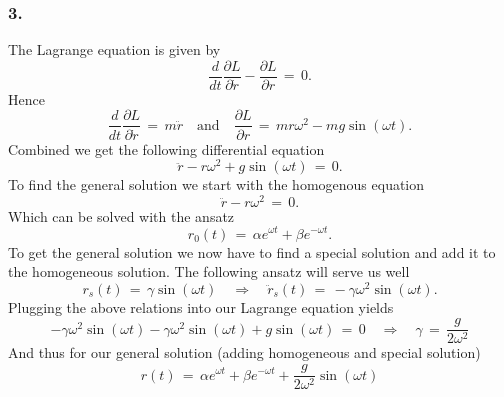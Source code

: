\subsubsection{3.}
The Lagrange equation is given by
\begin{equation*}
  \frac{d}{dt} \frac{\partial L}{\partial \dot r} - \frac{\partial L}{\partial
r} \,=\, 0.
\end{equation*}
Hence
\begin{equation*}
  \frac{d}{dt} \frac{\partial L}{\partial \dot r} \,=\, m \ddot r \quad
\text{and} \quad \frac{\partial L}{\partial r} \,=\, mr\omega^2 - mg
\sin(\omega t).
\end{equation*}
Combined we get the following differential equation
\begin{equation*}
   \ddot r - r \omega^2 + g\sin(\omega t) \,=\, 0.
\end{equation*}
To find the general solution we start with the homogenous equation 
\begin{equation*}
  \ddot r - r\omega^2 \,=\, 0.
\end{equation*}
Which can be solved with the ansatz
\begin{equation*}
  r_0(t) \,=\, \alpha e^{\omega t} + \beta e^{-\omega t}.
\end{equation*}
To get the general solution we now have to find a special solution and add it
to the homogeneous solution. The following ansatz will serve us well
\begin{equation*}
  r_s(t) \,=\, \gamma \sin(\omega t) \quad \Rightarrow \quad \ddot r_s(t) \,=\,
-\gamma \omega^2 \sin(\omega t).
\end{equation*}
Plugging the above relations into our Lagrange equation yields
\begin{equation*}
  - \gamma \omega^2 \sin(\omega t) - \gamma \omega^2 \sin(\omega t) + g
\sin(\omega t) \,=\, 0 \quad \Rightarrow \quad \gamma \,=\, \frac{g}{2\omega^2}  
\end{equation*}
And thus for our general solution (adding homogeneous and special solution) 
\begin{equation*}
  r(t) \,=\, \alpha e^{\omega t} + \beta e^{-\omega t} + \frac{g}{2\omega^2}
\sin(\omega t)
\end{equation*}
